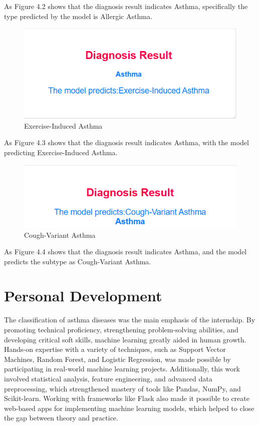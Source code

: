 \newline
As Figure 4.2 shows that the diagnosis result indicates Asthma, specifically the type predicted by the model is Allergic Asthma.
\begin{figure}[h]
    \centering
    \begin{minipage}{0.5\linewidth}
        \centering
        \includegraphics[width=\linewidth]{Images/u3.png}
        \caption{Exercise-Induced Asthma}
        \label{fig:ui5}
    \end{minipage}
\end{figure}
\newline 
As Figure 4.3 shows that the diagnosis result indicates Asthma, with the model predicting Exercise-Induced Asthma.
\begin{figure}[h]
    \centering
    \begin{minipage}{0.5\linewidth}
        \centering
        \includegraphics[width=\linewidth]{Images/u4.png}
        \caption{Cough-Variant Asthma}
        \label{fig:ui5}
    \end{minipage}
\end{figure}
\newline 
As Figure 4.4 shows that the diagnosis result indicates Asthma, and the model predicts the subtype as Cough-Variant Asthma.

\section{Personal Development}
The classification of asthma diseases was the main emphasis of the internship. By promoting technical proficiency, strengthening problem-solving abilities, and developing critical soft skills, machine learning greatly aided in human growth. Hands-on expertise with a variety of techniques, such as Support Vector Machines, Random Forest, and Logistic Regression, was made possible by participating in real-world machine learning projects. Additionally, this work involved statistical analysis, feature engineering, and advanced data preprocessing, which strengthened mastery of tools like Pandas, NumPy, and Scikit-learn. Working with frameworks like Flask also made it possible to create web-based apps for implementing machine learning models, which helped to close the gap between theory and practice.


